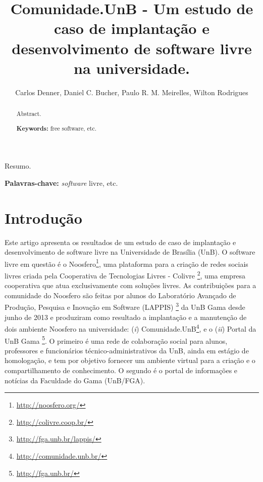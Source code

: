 \documentclass[12pt]{article}
\begin{document}
\sloppy

\title{Comunidade.UnB - Um estudo de caso de implantação e \\
    desenvolvimento de software livre na universidade.}

\author{Carlos Denner, Daniel C. Bucher, Paulo R. M. Meirelles,  Wilton Rodrigues}


\address{Departamento de Administração -- Universidade de Brasília (UnB)\\
  Campus Universitário Darcy Ribeiro - ICC Ala Norte, Bloco B -- Brasília -- DF -- Brasil
\nextinstitute
  Faculdade do Gama -- Universidade de Brasília (UnB)\\
  Área Especial, Projeção A -- 72.444-240 -- Gama -- DF -- Brasil
}


\maketitle
\begin{abstract}
  Abstract.

\textbf{Keywords:} free software, etc.

\end{abstract}

\begin{resumo}
  Resumo.

\textbf{Palavras-chave:} \textit{software} livre, etc.
\end{resumo}


\section{Introdução} \label{sec:intro}

Este artigo apresenta os resultados de um estudo de caso de implantação e
desenvolvimento de software livre na Universidade de Brasília (UnB). O
software livre em questão é o Noosfero\footnote{\url{http://noosfero.org/}},
uma plataforma para a criação de redes sociais livres criada pela
Cooperativa de Tecnologias Livres - Colivre%
\footnote{\url{http://colivre.coop.br/}}, uma empresa cooperativa que atua
exclusivamente com soluções livres. As contribuições para a comunidade do
Noosfero são feitas por alunos do Laboratório Avançado de Produção,
Pesquisa e Inovação em Software (LAPPIS)%
\footnote{\url{http://fga.unb.br/lappis/}} da UnB Gama desde junho de 2013
e produziram como resultado a implantação e a manutenção de dois ambiente
Noosfero na universidade: (\textit{i}) Comunidade.UnB\footnote{%
\url{http://comunidade.unb.br/}}, e o (\textit{ii}) Portal da UnB Gama%
\footnote{\url{http://fga.unb.br/}}. O primeiro é uma rede de colaboração
social para alunos, professores e funcionários técnico-administrativos da
UnB, ainda em estágio de homologação, e tem por objetivo fornecer um ambiente
virtual para a criação e o compartilhamento de conhecimento. O segundo é o
portal de informações e notícias da Faculdade do Gama (UnB/FGA).
\end{document}
